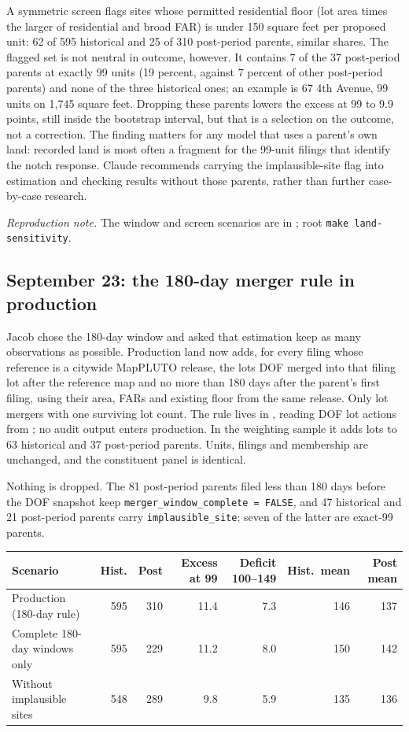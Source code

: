A symmetric screen flags sites whose permitted residential floor (lot area
times the larger of residential and broad FAR) is under 150 square feet per
proposed unit: 62 of 595 historical and 25 of 310 post-period parents, similar
shares. The flagged set is not neutral in outcome, however. It contains 7 of the
37 post-period parents at exactly 99 units (19 percent, against 7 percent of
other post-period parents) and none of the three historical ones; an example is
67 4th Avenue, 99 units on 1,745 square feet. Dropping these parents lowers the
excess at 99 to 9.9 points, still inside the bootstrap interval, but that is a
selection on the outcome, not a correction. The finding matters for any model
that uses a parent's own land: recorded land is most often a fragment for the
99-unit filings that identify the notch response. Claude recommends carrying
the implausible-site flag into estimation and checking results without those
parents, rather than further case-by-case research.

\textit{Reproduction note.} The window and screen scenarios are in
; root \texttt{make land-sensitivity}.

\subsection*{September 23: the 180-day merger rule in production}

Jacob chose the 180-day window and asked that estimation keep as many
observations as possible. Production land now adds, for every filing whose
reference is a citywide MapPLUTO release, the lots DOF merged into that filing
lot after the reference map and no more than 180 days after the parent's first
filing, using their area, FARs and existing floor from the same release. Only
lot mergers with one surviving lot count. The rule lives in
, reading DOF lot actions from
; no audit output enters production. In the
weighting sample it adds lots to 63 historical and 37 post-period parents. Units,
filings and membership are unchanged, and the constituent panel is identical.

Nothing is dropped. The 81 post-period parents filed less than 180 days before
the DOF snapshot keep \texttt{merger\_window\_complete = FALSE}, and 47
historical and 21 post-period parents carry \texttt{implausible\_site}; seven of
the latter are exact-99 parents.

\begin{center}
\small
\begin{tabular}{lrrrrrr}
\hline
Scenario & Hist. & Post & Excess at 99 & Deficit 100--149 & Hist.\ mean & Post mean \\
\hline
Production (180-day rule) & 595 & 310 & 11.4 & 7.3 & 146 & 137 \\
Complete 180-day windows only & 595 & 229 & 11.2 & 8.0 & 150 & 142 \\
Without implausible sites & 548 & 289 & 9.8 & 5.9 & 135 & 136 \\
\hline
\end{tabular}
\end{center}

